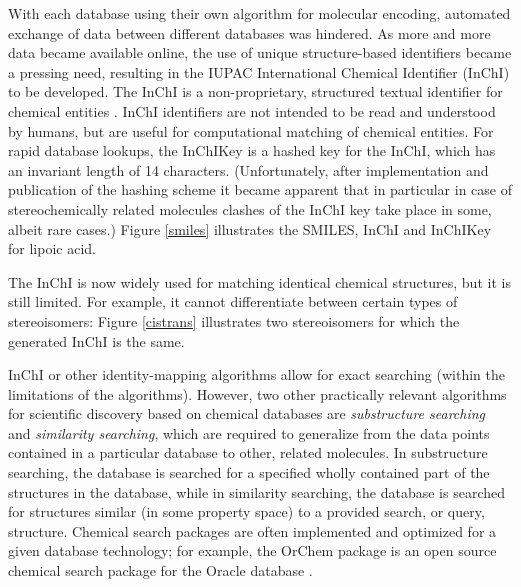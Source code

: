 \documentclass{sig-alternate}
\begin{document}
With each database using their own algorithm for molecular encoding,
automated exchange of data between different databases was hindered.
As more and more data became available online, the use of unique
structure-based identifiers became a pressing need, resulting in the IUPAC
International Chemical Identifier (InChI) to be developed. The
InChI is a non-proprietary, structured textual identifier for chemical
entities \cite{inchi}. InChI identifiers are not intended to be read and
understood by humans, but are useful for computational matching of
chemical entities. For rapid database lookups, the InChIKey is a
hashed key for the InChI, which has an invariant length of 14
characters. (Unfortunately, after implementation and publication of the hashing scheme it became apparent that in particular in case of stereochemically related molecules clashes of the InChI key take place in some, albeit rare cases.) Figure \ref{smiles} illustrates the SMILES, InChI and InChIKey for
lipoic acid.


The InChI is now widely used for matching identical chemical structures, but it
is still limited. For example, it cannot differentiate between
certain types of stereoisomers: Figure \ref{cistrans} illustrates two stereoisomers for which
the generated InChI is the same.


InChI or other identity-mapping algorithms allow for exact searching (within the
limitations of the algorithms). However, two other practically relevant algorithms for scientific
discovery based on chemical databases are \emph{substructure searching} and \emph{similarity
searching}, which are required to generalize from the data points contained in a particular database to other, related molecules. In substructure searching, the database is searched for a specified
wholly contained part of the structures in the database, while in similarity
searching, the database is searched for structures similar (in some property space) to a provided search, or query, 
structure. Chemical search packages are often implemented and optimized for a
given database technology; for example, the OrChem package is an open source
chemical search package for the Oracle database \cite{rijnbeek2009}.
\end{document}
